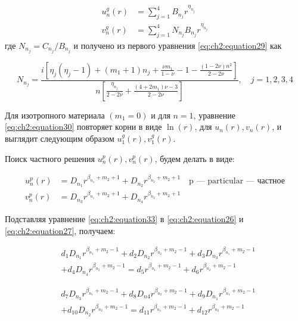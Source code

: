 \begin{equation}
\label{eq:ch2:equation31}
\begin{split}
	u_n^g(r) &= \sum_{j=1}^4 B_{n_j} r^{\eta_{n_j}}\\
	v_n^g(r) &= \sum_{j=1}^4 N_{n_j} B_{n_j} r^{\eta_{n_j}}
\end{split}
\end{equation}
где \( N_{n_j} = C_{n_j} / B_{n_j}\) и получено из первого уравнения \cref{eq:ch2:equation29} как

\begin{equation}
\label{eq:ch2:equation32}
	N_{n_j} = \frac{i \left [ \eta_j \left (\eta_j -1 \right ) + \left ( m_1 +1 \right ) n_j +\frac{\nu m_1}{1-\nu} -1 - \frac{\left (1-2\nu \right ) n^2}{2-2\nu} \right ]}{n \left [ \frac{\eta_{n_j}}{2-2\nu} + \frac{\left (4+2m_1 \right )\nu -3}{2-2\nu} \right ]}, \quad j=1,2,3,4
\end{equation}

Для изотропного материала \((m_1=0) \) и для \(n=1\), уравнение \cref{eq:ch2:equation30} повторяет корни в виде \( \ln{(r)}\), для \(u_n(r), v_n(r) \), и выглядит следующим образом \(u_1^g(r), v_1^g(r)\).

Поиск частного решения \(u_n^p(r), v_n^p(r) \), будем делать в виде:

\begin{equation}
\label{eq:ch2:equation33}
\begin{split}
	u_n^p(r) &= D_{n_1} r^{\beta_{n_1} + m_2 + 1} + D_{n_2} r^{\beta_{n_2} +m_2 + 1} \quad \text{p --- particular --- частное}\\
	v_n^p(r) &= D_{n_3} r^{\beta_{n_1} + m_2 + 1} + D_{n_4} r^{\beta_{n_2} +m_2 + 1}
\end{split}
\end{equation}

Подставляя уравнение \cref{eq:ch2:equation33} в \cref{eq:ch2:equation26} и \cref{eq:ch2:equation27}, получаем:

\begin{equation}
\label{eq:ch2:equation34}
\begin{split}
	&d_1 D_{n_1} r^{\beta_{n_1}+m_2-1} + d_2 D_{n_2} r^{\beta_{n_2}+m_2-1} + d_3 D_{n_3} r^{\beta_{n_1}+m_2-1} \\
	&+d_4 D_{n_4} r^{\beta_{n_2}+m_2-1} = d_5  r^{\beta_{n_1}+m_2-1} + d_6  r^{\beta_{n_2}+m_2-1}
\end{split}
\end{equation}

\begin{equation}
\label{eq:ch2:equation35}
\begin{split}
	&d_7 D_{n_3} r^{\beta_{n_1}+m_2-1} + d_8 D_{n4} r^{\beta_{n_2}+m_2-1} + d_9 D_{n_1} r^{\beta_{n_1}+m_2-1} \\
	&+d_{10} D_{n_2} r^{\beta_{n_2}+m_2-1} = d_{11} r^{\beta_{n_1}+m_2-1} + d_{12}  r^{\beta_{n_2}+m_2-1}
\end{split}
\end{equation}

